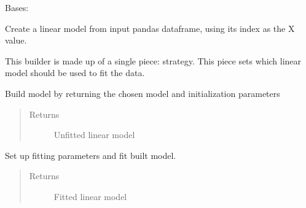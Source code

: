 \documentclass[letterpaper,10pt,english]{sphinxmanual}
\begin{document}
\begin{fulllineitems}
\label{\detokenize{dalio.pipe:dalio.pipe.PandasLinearModel}}
Bases: {\hyperref[\detokenize{dalio.pipe:dalio.pipe.pipe.PipeBuilder}]{}}

Create a linear model from input pandas dataframe, using its index
as the X value.

This builder is made up of a single piece: strategy. This piece sets
which linear model should be used to fit the data.

\begin{fulllineitems}
\label{\detokenize{dalio.pipe:dalio.pipe.PandasLinearModel.build_model}}
Build model by returning the chosen model and initialization
parameters
\begin{quote}\begin{description}
\item[{Returns}] \leavevmode
Unfitted linear model

\end{description}\end{quote}

\end{fulllineitems}


\begin{fulllineitems}
\label{\detokenize{dalio.pipe:dalio.pipe.PandasLinearModel.transform}}
Set up fitting parameters and fit built model.
\begin{quote}\begin{description}
\item[{Returns}] \leavevmode
Fitted linear model

\end{description}\end{quote}

\end{fulllineitems}


\end{fulllineitems}
\end{document}
